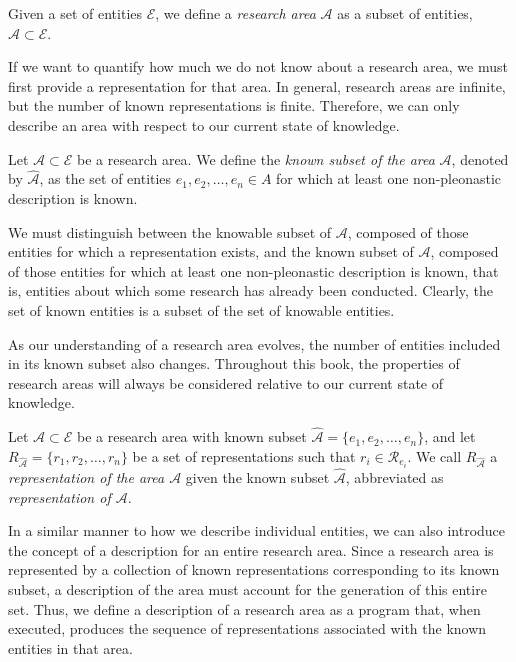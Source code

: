 \begin{definition}
Given a set of entities $\mathcal{E}$, we define a \emph{research area} $\mathcal{A}$ as a subset of entities, $\mathcal{A} \subset \mathcal{E}$.
\end{definition}

If we want to quantify how much we do not know about a research area, we must first provide a representation for that area. In general, research areas are infinite, but the number of known representations is finite. Therefore, we can only describe an area with respect to our current state of knowledge.

\begin{definition}
Let $\mathcal{A} \subset \mathcal{E}$ be a research area. We define the \emph{known subset of the area} $\mathcal{A}$, denoted by $\hat{\mathcal{A}}$, as the set of entities $e_1, e_2, \ldots, e_n \in A$ for which at least one non-pleonastic description is known.
\end{definition}

We must distinguish between the knowable subset of $\mathcal{A}$, composed of those entities for which a representation exists, and the known subset of $\mathcal{A}$, composed of those entities for which at least one non-pleonastic description is known, that is, entities about which some research has already been conducted. Clearly, the set of known entities is a subset of the set of knowable entities.

As our understanding of a research area evolves, the number of entities included in its known subset also changes. Throughout this book, the properties of research areas will always be considered relative to our current state of knowledge.

\begin{definition}
Let $\mathcal{A} \subset \mathcal{E}$ be a research area with known subset $\hat{\mathcal{A}} = \{ e_1, e_2, \ldots, e_n \}$, and let $R_{\hat{\mathcal{A}}} = \{ r_1, r_2, \ldots, r_n \}$ be a set of representations such that $r_i \in \mathcal{R}_{e_i}$. We call $R_{\hat{\mathcal{A}}}$ a \emph{representation of the area $\mathcal{A}$} given the known subset $\hat{\mathcal{A}}$, abbreviated as \emph{representation of $\mathcal{A}$}.
\end{definition}

In a similar manner to how we describe individual entities, we can also introduce the concept of a description for an entire research area. Since a research area is represented by a collection of known representations corresponding to its known subset, a description of the area must account for the generation of this entire set. Thus, we define a description of a research area as a program that, when executed, produces the sequence of representations associated with the known entities in that area.

